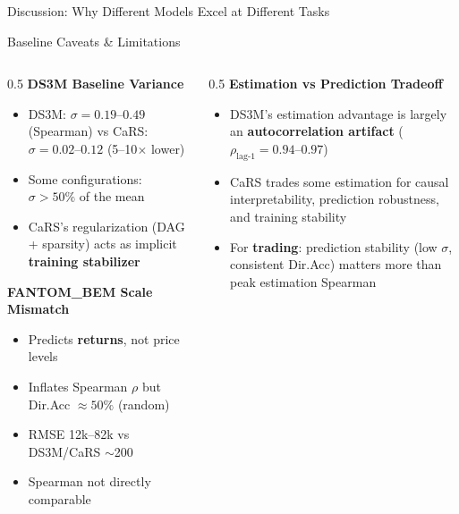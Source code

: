 \documentclass[aspectratio=169]{beamer}
\begin{document}
\begin{frame}{Discussion: Why Different Models Excel at Different Tasks}
\begin{center}
\end{center}
\end{frame}

\begin{frame}{Baseline Caveats \& Limitations}
\small
\begin{columns}
\begin{column}{0.5\textwidth}
\textbf{DS3M Baseline Variance}
\begin{itemize}
    \item DS3M: $\sigma = 0.19$--$0.49$ (Spearman) vs CaRS: $\sigma = 0.02$--$0.12$ (5--10$\times$ lower)
    \item Some configurations: $\sigma > 50\%$ of the mean
    \item CaRS's regularization (DAG + sparsity) acts as implicit \textbf{training stabilizer}
\end{itemize}

\textbf{FANTOM\_BEM Scale Mismatch}
\begin{itemize}
    \item Predicts \textbf{returns}, not price levels
    \item Inflates Spearman $\rho$ but Dir.Acc $\approx 50\%$ (random)
    \item RMSE 12k--82k vs DS3M/CaRS $\sim$200
    \item \textcolor{warnred}{Spearman not directly comparable}
\end{itemize}
\end{column}

\begin{column}{0.5\textwidth}
\textbf{Estimation vs Prediction Tradeoff}
\begin{itemize}
    \item DS3M's estimation advantage is largely an \textbf{autocorrelation artifact} ($\rho_{\text{lag-1}} = 0.94$--$0.97$)
    \item CaRS trades some estimation for causal interpretability, prediction robustness, and training stability
    \item For \textbf{trading}: prediction stability (low $\sigma$, consistent Dir.Acc) matters more than peak estimation Spearman
\end{itemize}


\end{column}
\end{columns}
\end{frame}
\end{document}
